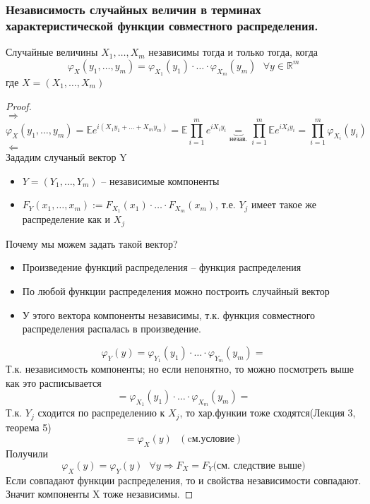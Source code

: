     \subsubsection{Независимость случайных величин в терминах характеристической функции совместного распределения.}
    \begin{theorem}
        Случайные величины $ X_1,\ldots, X_m $ независимы тогда и только тогда, когда 
        $$\varphi_X(y_1,\ldots, y_m) = \varphi_{X_1}(y_1)\cdot\ldots\cdot\varphi_{X_m}(y_m)\text{ }\forall y\in\mathbb{R}^m$$
        где $X = (X_1, \ldots, X_m)$
    \end{theorem}
    \begin{proof}
        \text{ }\\
        $\Rightarrow$\\
        $$\varphi_X(y_1,\ldots,y_m) = \mathbb{E}e^{i(X_1y_1 + \ldots + X_my_m)} = \mathbb{E}\prod_{i = 1}^{m}e^{iX_iy_i} \underbrace{=}_{\text{незав.}} \prod_{i = 1}^m\mathbb{E}e^{iX_iy_i} = \prod_{i = 1}^m\varphi_{X_i}(y_i)$$
        $\Leftarrow$\\
        Зададим случаный вектор Y
        \begin{itemize}
            \item 
            $Y = (Y_1,\ldots, Y_m)$ -- независимые компоненты
            
            \item 
            $F_Y(x_1,\ldots, x_m):= F_{X_1}(x_1)\cdot\ldots\cdot F_{X_m}(x_m)$, т.е. $ Y_j $ имеет такое же распределение как и $ X_j $
        \end{itemize}
        Почему мы можем задать такой вектор?
        \begin{itemize}
            \item Произведение функций распределения -- функция распределения
            \item По любой функции распределения можно построить случайный вектор
            \item У этого вектора компоненты независимы, т.к. функция совместного распределения распалась в произведение. 
        \end{itemize}
        $$\varphi_Y(y) = \varphi_{Y_1}(y_1)\cdot\ldots\cdot\varphi_{Y_m}(y_m) = $$
        Т.к. независимость компоненты; но если непонятно, то можно посмотреть выше как это расписывается
        $$ = \varphi_{X_1}(y_1)\cdot\ldots\cdot\varphi_{X_m}(y_m) = $$
        Т.к. $ Y_j $ сходится по распределению к $ X_j $, то хар.функии тоже сходятся(Лекция 3, теорема 5)
        $$ = \varphi_X(y)\text{ }(\text{cм.условие})$$
        Получили
        $$\varphi_X(y) = \varphi_{Y}(y)\text{ }\forall y\Rightarrow F_X = F_Y\text{(см. следствие выше)}$$
        Если совпадают функции распределения, то и свойства независимости совпадают. Значит компоненты X тоже независимы.
    \end{proof}
